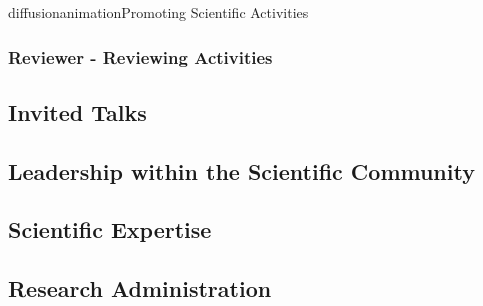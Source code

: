 \documentclass{ra2018}
\begin{document}
\begin{module}{diffusion}{animation}{Promoting Scientific Activities}
    \subsubsection{Reviewer - Reviewing Activities}
\subsection{Invited Talks}
\subsection{Leadership within the Scientific Community}
\subsection{Scientific Expertise}
\subsection{Research Administration}
  
\end{module}
\end{document}
